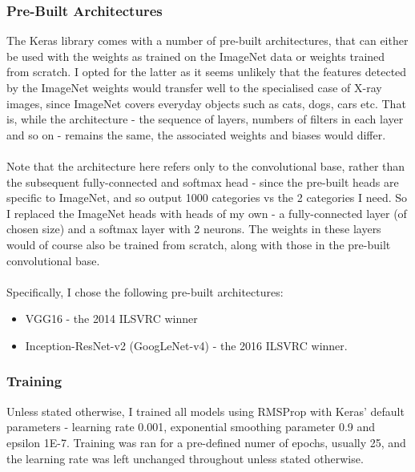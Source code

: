 \documentclass[11pt]{article} %
\theoremstyle{plain}
\theoremstyle{definition}
\begin{document}
\subsubsection{Pre-Built Architectures}
The Keras library comes with a number of pre-built architectures, that can either be used with the weights as trained on the ImageNet data or weights trained from scratch. I opted for the latter as it seems unlikely that the features detected by the ImageNet weights would transfer well to the specialised case of X-ray images, since ImageNet covers everyday objects such as cats, dogs, cars etc. That is, while the architecture - the sequence of layers, numbers of filters in each layer and so on - remains the same, the associated weights and biases would differ. 
\\
\\
\noindent
Note that the architecture here refers only to the convolutional base, rather than the subsequent fully-connected and softmax head - since the pre-built heads are specific to ImageNet, and so output 1000 categories vs the 2 categories I need. So I replaced the ImageNet heads with heads of my own - a fully-connected layer (of chosen size) and a softmax layer with 2 neurons. The weights in these layers would of course also be trained from scratch, along with those in the pre-built convolutional base.
\\
\\
\noindent
Specifically, I chose the following pre-built architectures:
\begin{itemize}
\item VGG16 - the 2014 ILSVRC winner
\item Inception-ResNet-v2 (GoogLeNet-v4) - the 2016 ILSVRC winner.
\end{itemize}
\subsubsection{Training}
Unless stated otherwise, I trained all models using RMSProp with Keras' default parameters - learning rate 0.001, exponential smoothing parameter 0.9 and epsilon 1E-7. Training was ran for a pre-defined numer of epochs, usually 25, and the learning rate was left unchanged throughout unless stated otherwise.
\end{document}
